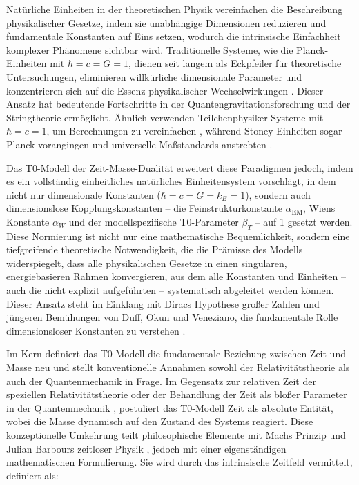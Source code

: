 \documentclass[twocolumn,aps,prl]{revtex4-2}
\begin{document}
	Natürliche Einheiten in der theoretischen Physik vereinfachen die Beschreibung physikalischer Gesetze, indem sie unabhängige Dimensionen reduzieren und fundamentale Konstanten auf Eins setzen, wodurch die intrinsische Einfachheit komplexer Phänomene sichtbar wird. Traditionelle Systeme, wie die Planck-Einheiten mit $\hbar = c = G = 1$, dienen seit langem als Eckpfeiler für theoretische Untersuchungen, eliminieren willkürliche dimensionale Parameter und konzentrieren sich auf die Essenz physikalischer Wechselwirkungen \cite{Planck1899}. Dieser Ansatz hat bedeutende Fortschritte in der Quantengravitationsforschung \cite{Rovelli2004, Ashtekar2007} und der Stringtheorie \cite{Greene1999} ermöglicht. Ähnlich verwenden Teilchenphysiker Systeme mit $\hbar = c = 1$, um Berechnungen zu vereinfachen \cite{Peskin1995}, während Stoney-Einheiten sogar Planck vorangingen und universelle Maßstandards anstrebten \cite{Stoney1881}.
	
	Das T0-Modell der Zeit-Masse-Dualität erweitert diese Paradigmen jedoch, indem es ein vollständig einheitliches natürliches Einheitensystem vorschlägt, in dem nicht nur dimensionale Konstanten ($\hbar = c = G = k_B = 1$), sondern auch dimensionslose Kopplungskonstanten – die Feinstrukturkonstante $\alpha_{\text{EM}}$, Wiens Konstante $\alpha_W$ und der modellspezifische T0-Parameter $\beta_T$ – auf 1 gesetzt werden. Diese Normierung ist nicht nur eine mathematische Bequemlichkeit, sondern eine tiefgreifende theoretische Notwendigkeit, die die Prämisse des Modells widerspiegelt, dass alle physikalischen Gesetze in einen singularen, energiebasieren Rahmen konvergieren, aus dem alle Konstanten und Einheiten – auch die nicht explizit aufgeführten – systematisch abgeleitet werden können. Dieser Ansatz steht im Einklang mit Diracs Hypothese großer Zahlen \cite{Dirac1937} und jüngeren Bemühungen von Duff, Okun und Veneziano, die fundamentale Rolle dimensionsloser Konstanten zu verstehen \cite{Duff2002}.
	
	Im Kern definiert das T0-Modell die fundamentale Beziehung zwischen Zeit und Masse neu und stellt konventionelle Annahmen sowohl der Relativitätstheorie als auch der Quantenmechanik in Frage. Im Gegensatz zur relativen Zeit der speziellen Relativitätstheorie \cite{Einstein1905} oder der Behandlung der Zeit als bloßer Parameter in der Quantenmechanik \cite{Schrodinger1926}, postuliert das T0-Modell Zeit als absolute Entität, wobei die Masse dynamisch auf den Zustand des Systems reagiert. Diese konzeptionelle Umkehrung teilt philosophische Elemente mit Machs Prinzip \cite{Mach1893} und Julian Barbours zeitloser Physik \cite{Barbour1999}, jedoch mit einer eigenständigen mathematischen Formulierung. Sie wird durch das intrinsische Zeitfeld vermittelt, definiert als:
	
\end{document}
